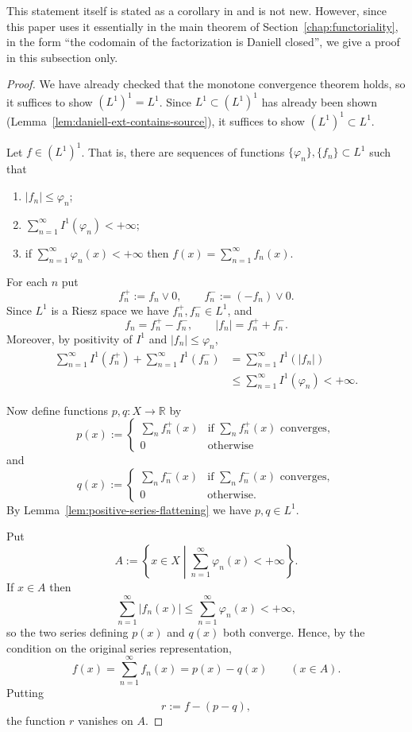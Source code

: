 \noindent
This statement itself is stated as a corollary in \cite{Yamagami} and is not new.
However, since this paper uses it essentially in the main theorem of
Section~\ref{chap:functoriality}, in the form ``the codomain of the
factorization is Daniell closed'', we give a proof in this subsection only.
\begin{proof}
  We have already checked that the monotone convergence theorem holds, so it
  suffices to show $(L^1)^1=L^1$.
  Since $L^1\subset(L^1)^1$ has already been shown
  (Lemma~\ref{lem:daniell-ext-contains-source}), it suffices to show
  $(L^1)^1\subset L^1$.

  Let $f\in (L^1)^1$. That is, there are sequences of functions
  $\{\varphi_n\},\{f_n\}\subset L^1$ such that
  \begin{enumerate}
    \item $|f_n|\le\varphi_n$;
    \item $\sum_{n=1}^\infty I^1(\varphi_n)<+\infty$;
    \item if $\sum_{n=1}^\infty \varphi_n(x)<+\infty$ then
      $f(x)=\sum_{n=1}^\infty f_n(x)$.
  \end{enumerate}
  For each $n$ put
  \[
    f_n^+:=f_n\lor0,
    \qquad
    f_n^-:=(-f_n)\lor0 .
  \]
  Since $L^1$ is a Riesz space we have $f_n^+,f_n^-\in L^1$, and
  \[
    f_n=f_n^+-f_n^-,
    \qquad
    |f_n|=f_n^++f_n^- .
  \]
  Moreover, by positivity of $I^1$ and $|f_n|\le\varphi_n$,
  \[
    \begin{aligned}
      \sum_{n=1}^\infty I^1(f_n^+)
      +\sum_{n=1}^\infty I^1(f_n^-)
      &=\sum_{n=1}^\infty I^1(|f_n|)\\
      &\le\sum_{n=1}^\infty I^1(\varphi_n)
      <+\infty.
    \end{aligned}
  \]

  Now define functions $p,q:X\to\mathbb{R}$ by
  \[
    p(x):=
    \begin{cases}
      \sum_n f_n^+(x) & \text{if $\sum_n f_n^+(x)$ converges},\\
      0 & \text{otherwise}
    \end{cases}
  \]
  and
  \[
    q(x):=
    \begin{cases}
      \sum_n f_n^-(x) & \text{if $\sum_n f_n^-(x)$ converges},\\
      0 & \text{otherwise.}
    \end{cases}
  \]
  By Lemma~\ref{lem:positive-series-flattening} we have $p,q\in L^1$.

  Put
  \[
    A:=\left\{x\in X\mathrel{}\middle|\mathrel{}\sum_{n=1}^\infty\varphi_n(x)<+\infty\right\} .
  \]
  If $x\in A$ then
  \[
    \sum_{n=1}^\infty|f_n(x)|
    \le
    \sum_{n=1}^\infty\varphi_n(x)
    <+\infty ,
  \]
  so the two series defining $p(x)$ and $q(x)$ both converge. Hence, by the
  condition on the original series representation,
  \[
    f(x)=\sum_{n=1}^\infty f_n(x)=p(x)-q(x)
    \qquad(x\in A).
  \]
  Putting
  \[
    r:=f-(p-q) ,
  \]
  the function $r$ vanishes on $A$.


\end{proof}

